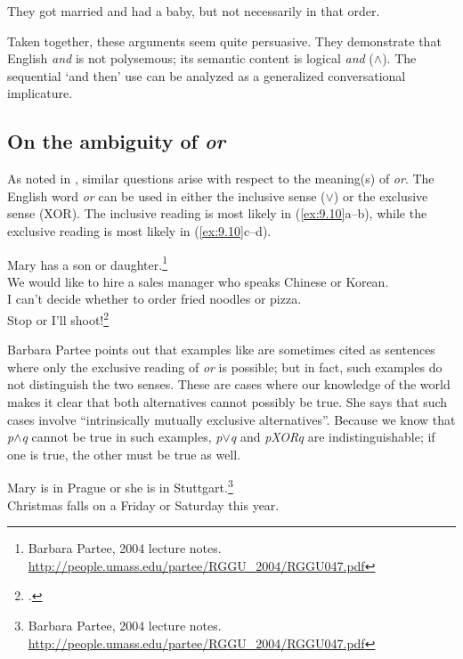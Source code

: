 \ea \label{ex:9.9}
They got married and had a baby, but not necessarily in that order.
\z


Taken together, these arguments seem quite persuasive. They demonstrate that English \textit{and} is not polysemous; its semantic content is logical \textit{and} ($\wedge$). The sequential ‘and then’ use can be analyzed as a generalized conversational implicature.


\subsection{On the ambiguity of \textit{or}}\label{sec:9.2.2}

As noted in , similar questions arise with respect to the meaning(s) of \textit{or}. The English word \textit{or} can be used in either the inclusive sense ($\vee$) or the exclusive sense (XOR). The inclusive reading is most likely in (\ref{ex:9.10}a--b), while the exclusive reading is most likely in (\ref{ex:9.10}c--d).


\ea \label{ex:9.10}
\ea Mary has a son or daughter.\footnote{Barbara Partee, 2004 lecture notes. \url{http://people.umass.edu/partee/RGGU_2004/RGGU047.pdf}} \\
\ex We would like to hire a sales manager who speaks Chinese or Korean.\\
\ex I can’t decide whether to order fried noodles or pizza.\\
\ex Stop or I’ll shoot!\footnote{\citet[113]{Saeed2009}.}
                       \z
\z


Barbara Partee points out that examples like  are sometimes cited as sentences where only the exclusive reading of \textit{or} is possible; but in fact, such examples do not distinguish the two senses. These are cases where our knowledge of the world makes it clear that both alternatives cannot possibly be true. She says that such cases involve “intrinsically mutually exclusive alternatives”. Because we know that \textit{p$\wedge$q} cannot be true in such examples, \textit{p$\vee$q} and \textit{pXORq} are indistinguishable; if one is true, the other must be true as well.


\ea \label{ex:9.11}
\ea Mary is in Prague or she is in Stuttgart.\footnote{Barbara Partee, 2004 lecture notes. \url{http://people.umass.edu/partee/RGGU_2004/RGGU047.pdf}} \\
\ex Christmas falls on a Friday or Saturday this year.
                       \z
\z


